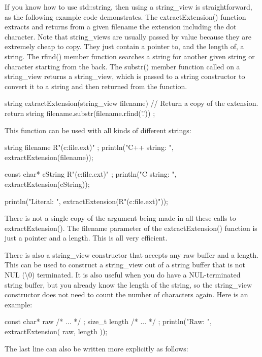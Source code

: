 If you know how to use std::string, then using a string\_view is straightforward, as the following example code demonstrates. The extractExtension() function extracts and returns from a given filename the extension including the dot character. Note that string\_views are usually passed by value because they are extremely cheap to copy. They just contain a pointer to, and the length of, a string. The rfind() member function searches a string for another given string or character starting from the back. The substr() member function called on a string\_view returns a string\_view, which is passed to a string constructor to convert it to a string and then returned from the function.

\begin{cpp}
string extractExtension(string_view filename)
{
    // Return a copy of the extension.
    return string { filename.substr(filename.rfind('.')) };
}
\end{cpp}

This function can be used with all kinds of different strings:

\begin{cpp}
string filename { R"(c:\temp\my file.ext)" };
println("C++ string: {}", extractExtension(filename));

const char* cString { R"(c:\temp\my file.ext)" };
println("C string: {}", extractExtension(cString));

println("Literal: {}", extractExtension(R"(c:\temp\my file.ext)"));
\end{cpp}

There is not a single copy of the argument being made in all these calls to extractExtension(). The filename parameter of the extractExtension() function is just a pointer and a length. This is all very efficient.

There is also a string\_view constructor that accepts any raw buffer and a length. This can be used to construct a string\_view out of a string buffer that is not NUL (\textbackslash{}0) terminated. It is also useful when you do have a NUL-terminated string buffer, but you already know the length of the string, so the string\_view constructor does not need to count the number of characters again. Here is an example:

\begin{cpp}
const char* raw { /* ... */ };
size_t length { /* ... */ };
println("Raw: {}", extractExtension({ raw, length }));
\end{cpp}

The last line can also be written more explicitly as follows:

